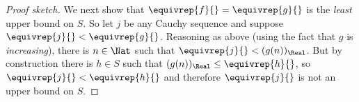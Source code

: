 \documentclass[../../../include/open-logic-section]{subfiles}
\begin{document}
\begin{proof}[Proof sketch]
We next show that $\equivrep{f}{} = \equivrep{g}{}$ is the \emph{least} upper bound on $S$. So let $j$ be any Cauchy sequence and suppose $\equivrep{j}{} < \equivrep{g}{}$. Reasoning as above (using the fact that $g$ is \emph{increasing}), there is $n \in \Nat$ such that $\equivrep{j}{} < (g(n))_\Real$. But by construction there is $h \in S$ such that $(g(n))_\Real \leq \equivrep{h}{}$, so $\equivrep{j}{} < \equivrep{h}{}$ and therefore $\equivrep{j}{}$ is not an upper bound on $S$.  
\end{proof}
\end{document}
